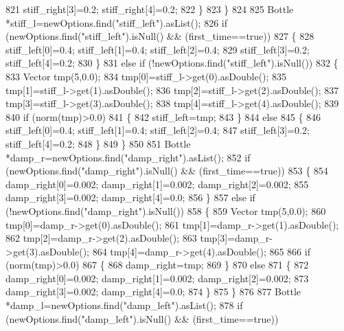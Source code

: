 \begin{DoxyCode}
821             stiff_right[3]=0.2; stiff_right[4]=0.2;
822         \}
823     \}
824 
825     Bottle *stiff\_l=newOptions.find(\textcolor{stringliteral}{"stiff\_left"}).asList();
826     \textcolor{keywordflow}{if} (newOptions.find(\textcolor{stringliteral}{"stiff\_left"}).isNull() && (first\_time==\textcolor{keyword}{true}))
827     \{
828         stiff_left[0]=0.4; stiff_left[1]=0.4; stiff_left[2]=0.4;
829         stiff_left[3]=0.2; stiff_left[4]=0.2;
830     \}
831     \textcolor{keywordflow}{else} \textcolor{keywordflow}{if} (!newOptions.find(\textcolor{stringliteral}{"stiff\_left"}).isNull())
832     \{
833         Vector tmp(5,0.0);
834         tmp[0]=stiff\_l->get(0).asDouble();
835         tmp[1]=stiff\_l->get(1).asDouble();
836         tmp[2]=stiff\_l->get(2).asDouble();
837         tmp[3]=stiff\_l->get(3).asDouble();
838         tmp[4]=stiff\_l->get(4).asDouble();
839 
840         \textcolor{keywordflow}{if} (norm(tmp)>0.0)
841         \{
842             stiff_left=tmp;
843         \}
844         \textcolor{keywordflow}{else}
845         \{
846             stiff_left[0]=0.4; stiff_left[1]=0.4; stiff_left[2]=0.4;
847             stiff_left[3]=0.2; stiff_left[4]=0.2;
848         \}
849     \}
850 
851     Bottle *damp\_r=newOptions.find(\textcolor{stringliteral}{"damp\_right"}).asList();
852     \textcolor{keywordflow}{if} (newOptions.find(\textcolor{stringliteral}{"damp\_right"}).isNull() && (first\_time==\textcolor{keyword}{true}))
853     \{
854         damp_right[0]=0.002; damp_right[1]=0.002; damp_right[2]=0.002;
855         damp_right[3]=0.002; damp_right[4]=0.0;
856     \}
857     \textcolor{keywordflow}{else} \textcolor{keywordflow}{if} (!newOptions.find(\textcolor{stringliteral}{"damp\_right"}).isNull())
858     \{
859         Vector tmp(5,0.0);
860         tmp[0]=damp\_r->get(0).asDouble();
861         tmp[1]=damp\_r->get(1).asDouble();
862         tmp[2]=damp\_r->get(2).asDouble();
863         tmp[3]=damp\_r->get(3).asDouble();
864         tmp[4]=damp\_r->get(4).asDouble();
865 
866         \textcolor{keywordflow}{if} (norm(tmp)>0.0)
867         \{
868             damp_right=tmp;
869         \}
870         \textcolor{keywordflow}{else}
871         \{
872             damp_right[0]=0.002; damp_right[1]=0.002; damp_right[2]=0.002;
873             damp_right[3]=0.002; damp_right[4]=0.0;
874         \}
875     \}
876 
877     Bottle *damp\_l=newOptions.find(\textcolor{stringliteral}{"damp\_left"}).asList();
878     \textcolor{keywordflow}{if} (newOptions.find(\textcolor{stringliteral}{"damp\_left"}).isNull() && (first\_time==\textcolor{keyword}{true}))

\end{DoxyCode}
